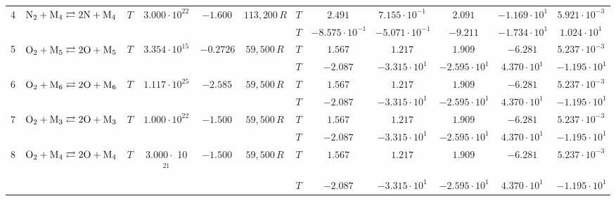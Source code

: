 \documentclass{warpdoc}
\begin{document}
\begin{table}[!ht]
\begin{center}
\begin{threeparttable}
\begin{tabular}{cccccccccccc}
                                          
4 & $\rm N_2 + M_4 \rightleftarrows 2N+M_4$ &$T$ & $3.000 \cdot 10^{22}$ & $-1.600$ & $113,200\, R$ 
                                          &$T$  & $2.491$  & $7.155 \cdot 10^{-1}$  & $2.091$ & $-1.169 \cdot 10^{1}$ & $5.921 \cdot 10^{-3}$\\
 & & & & &                                &$T$  & $-8.575 \cdot 10^{-1}$  & $-5.071 \cdot 10^{-1}$  & $-9.211$ & $-1.734 \cdot 10^{1}$ & $1.024 \cdot 10^{1}$\\                                          
                                          
                                          
5 & $\rm O_2 + M_5 \rightleftarrows 2O+M_5$ &$T$ & $3.354 \cdot 10^{15}$ & $-0.2726$ & $59,500\, R$ 
                                          &$T$  & $1.567$  & $1.217$  & $1.909$ & $-6.281$ & $5.237 \cdot 10^{-3}$\\
 & & & & &                                &$T$  & $-2.087$  & $-3.315 \cdot 10^{1}$  & $-2.595 \cdot 10^{1}$ & $4.370 \cdot 10^{1}$ & $-1.195 \cdot 10^{1}$\\                                          
                                                                                   
6 & $\rm O_2 + M_6 \rightleftarrows 2O+M_6$ &$T$ & $1.117 \cdot 10^{25}$ & $-2.585$ & $59,500\, R$ 
                                          &$T$  & $1.567$  & $1.217$  & $1.909$ & $-6.281$ & $5.237 \cdot 10^{-3}$\\
 & & & & &                                &$T$  & $-2.087$  & $-3.315 \cdot 10^{1}$  & $-2.595 \cdot 10^{1}$ & $4.370 \cdot 10^{1}$ & $-1.195 \cdot 10^{1}$\\                                          
                                                                                    
7 & $\rm O_2 + M_3 \rightleftarrows 2O+M_3$ &$T$ & $1.000 \cdot 10^{22}$ & $-1.500$ & $59,500\, R$ 
                                          &$T$  & $1.567$  & $1.217$  & $1.909$ & $-6.281$ & $5.237 \cdot 10^{-3}$\\
 & & & & &                                &$T$  & $-2.087$  & $-3.315 \cdot 10^{1}$  & $-2.595 \cdot 10^{1}$ & $4.370 \cdot 10^{1}$ & $-1.195 \cdot 10^{1}$\\                                          
                                                                                   
8 & $\rm O_2 + M_4 \rightleftarrows 2O+M_4$ &$T$ & $3.000 \cdot$ 10$^{21}$ & $-1.500$ & $59,500\, R$ 
                                          &$T$  & $1.567$  & $1.217$  & $1.909$ & $-6.281$ & $5.237 \cdot 10^{-3}$\\
 & & & & &                                &$T$  & $-2.087$  & $-3.315 \cdot 10^{1}$  & $-2.595 \cdot 10^{1}$ & $4.370 \cdot 10^{1}$ & $-1.195 \cdot 10^{1}$\\
 

\end{tabular}
\end{threeparttable}
\end{center}
\end{table}
\end{document}
